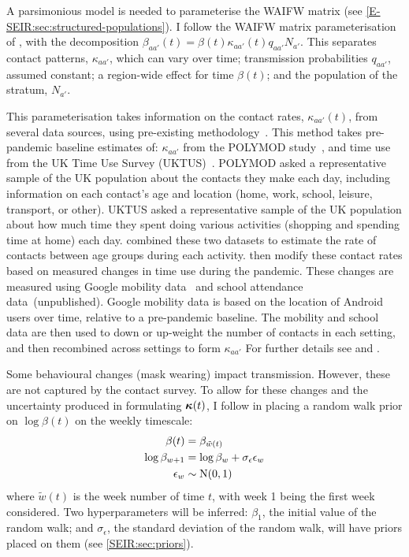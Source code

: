 \documentclass[thesis.tex]{subfiles}
\begin{document}
A parsimonious model is needed to parameterise the WAIFW matrix (see \cref{E-SEIR:sec:structured-populations}).
I follow the WAIFW matrix parameterisation of \textcite{birrellRealtime}, with the decomposition $\beta_{aa'}(t) = \beta(t) \kappa_{aa'}(t) q_{aa'} N_{a'}$.
This separates contact patterns, $\kappa_{aa'}$, which can vary over time; transmission probabilities $q_{aa'}$, assumed constant; a region-wide effect for time $\beta(t)$; and the population of the stratum, $N_{a'}$.

This parameterisation takes information on the contact rates, $\kappa_{aa'}(t)$, from several data sources, using pre-existing methodology~\autocites{vanleeuwenTime}{vanleeuwenAugmenting}.
This method takes pre-pandemic baseline estimates of: $\kappa_{aa'}$ from the POLYMOD study~\autocite{mossongSocial}, and time use from the UK Time Use Survey (UKTUS)~\autocite{UKTUS}.
POLYMOD asked a representative sample of the UK population about the contacts they make each day, including information on each contact's age and location (home, work, school, leisure, transport, or other).
UKTUS asked a representative sample of the UK population about how much time they spent doing various activities (\eg shopping and spending time at home) each day.
\Textcite{vanleeuwenAugmenting} combined these two datasets to estimate the rate of contacts between age groups during each activity.
\Textcite{birrellRealtime} then modify these contact rates based on measured changes in time use during the pandemic.
These changes are measured using Google mobility data~\autocite{googleCOVID19} and school attendance data~(unpublished).
Google mobility data is based on the location of Android users over time, relative to a pre-pandemic baseline.
The mobility and school data are then used to down or up-weight the number of contacts in each setting, and then recombined across settings to form $\kappa_{aa'}$
For further details see \textcite{vanleeuwenAugmenting} and \textcite[supplementary material]{birrellRealtime}.

Some behavioural changes (\eg mask wearing) impact transmission.
However, these are not captured by the contact survey.
To allow for these changes and the uncertainty produced in formulating $\bm{\kappa}(t)$, I follow \textcite{birrellRealtime} in placing a random walk prior on $\log\beta(t)$  on the weekly timescale:
\begin{align}
    \beta(t) &= \beta_{\tilde{w}(t)} \\
    \log\beta_{w+1} &= \log\beta_w + \sigma_\epsilon \epsilon_w \\
    \epsilon_w &\sim \operatorname{N}(0, 1)
\end{align}
where $\tilde{w}(t)$ is the week number of time $t$, with week 1 being the first week considered.
Two hyperparameters will be inferred: $\beta_1$, the initial value of the random walk; and $\sigma_\epsilon$, the standard deviation of the random walk, will have priors placed on them (see \cref{SEIR:sec:priors}).
\end{document}
